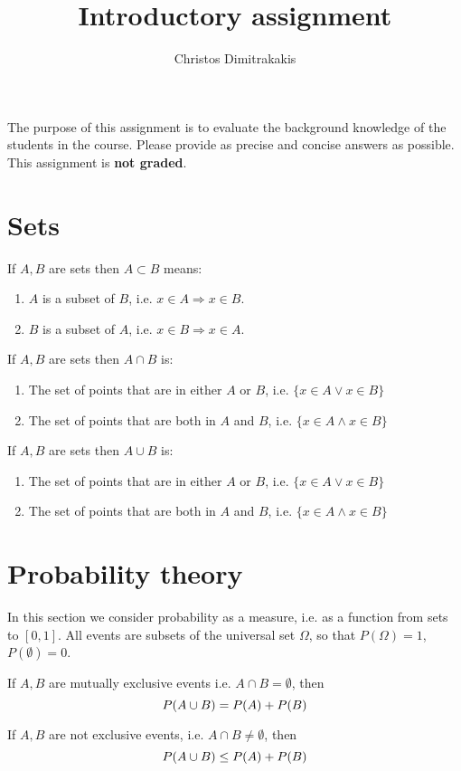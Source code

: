 \documentclass[a4paper]{article}
\title{Introductory assignment}
\author{Christos Dimitrakakis}
\def\solution {1}
\begin{document}
\maketitle

The purpose of this assignment is to evaluate the background knowledge
of the students in the course. Please provide as precise and concise
answers as possible. This assignment is \textbf{not graded}.

\section{Sets}
\begin{exercise}
  If $A, B$ are sets then
  $A \subset B$ means:
  \begin{enumerate}
  \item $A$ is a subset of $B$, i.e. $x \in A \Rightarrow x \in B$.
  \item $B$ is a subset of $A$, i.e. $x \in B \Rightarrow x \in A$.
  \end{enumerate}
\end{exercise}


\begin{exercise}
  If $A, B$ are sets then
  $A \cap B$ is:
  \begin{enumerate}
  \item The set of points that are in either $A$ or $B$, i.e. $\{x \in A \vee x \in B\}$
  \item The set of points that are both in $A$ and $B$, i.e. $\{x \in A \wedge x \in B\}$ 
  \end{enumerate}
\end{exercise}

\begin{exercise}
  If $A, B$ are sets then
  $A \cup B$ is:
  \begin{enumerate}
  \item The set of points that are in either $A$ or $B$, i.e. $\{x \in A \vee x \in B\}$
  \item The set of points that are both in $A$ and $B$, i.e. $\{x \in A \wedge x \in B\}$ 
  \end{enumerate}
\end{exercise}



\section{Probability theory}
In this section we consider probability as a measure, i.e. as a function from sets to $[0,1]$. All events are subsets of the universal set $\Omega$, so that $P(\Omega) = 1$, $P(\emptyset) = 0$.
\begin{exercise}
  If $A, B$ are mutually exclusive events i.e. $A \cap B = \emptyset$,  then 
  \[
  P(A \cup B) =
  \ifdefined \solution
  P(A) + P(B)
  \else
  \ldots
  \fi
  \]
\end{exercise}
\begin{exercise}
  If $A, B$ are not exclusive events, i.e. $A \cap B \neq \emptyset$, then 
  \[
  P(A \cup B) \leq
  \ifdefined \solution
  P(A) + P(B)
  \else
  \ldots
  \fi
  \]
\end{exercise}
\end{document}

